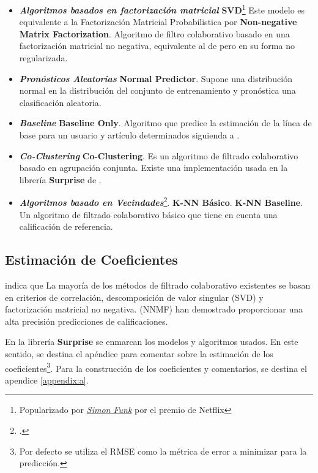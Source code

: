 \documentclass{article}
\begin{document}
\begin{itemize}
    \item \textit{\textbf{Algoritmos basados en factorización matricial}}
    \subitem \textbf{SVD}\footnote{Popularizado por \href{https://sifter.org/~simon/journal/20061211.html}{\textit{Simon Funk}} por el premio de Netflix} Este modelo es equivalente a la Factorización Matricial Probabilistica por \cite{pmf2007}
    \subitem \textbf{Non-negative Matrix Factorization}. Algoritmo de filtro colaborativo basado en una factorización matricial no negativa, equivalente al de \cite{Zhang2013} pero en su forma no regularizada.
    \item \textit{\textbf{Pronósticos Aleatorias}}
    \subitem \textbf{Normal Predictor}. Supone una distribución normal en la distribución del conjunto de entrenamiento y pronóstica una clasificación aleatoria.
    \item \textit{\textbf{Baseline}}
    \subitem \textbf{Baseline Only}. Algoritmo que predice la estimación de la línea de base para un usuario y artículo determinados siguienda a \cite{5197422}.
    \item \textit{\textbf{Co-Clustering}}
    \subitem \textbf{Co-Clustering}. Es un algoritmo de filtrado colaborativo basado en agrupación conjunta. Existe una implementación usada en la librería \textbf{Surprise} de \cite{George05ascalable}.
    \item \textit{\textbf{Algoritmos basado en Vecindades}}\footcite[En la librería Surprise se construyó estos con algoritmos que se derivan directamente de un enfoque básico de vecinos más cercanos.]{Hug2020}.
    \subitem \textbf{K-NN Básico}.
    \subitem \textbf{K-NN Baseline}. Un algoritmo de filtrado colaborativo básico que tiene en cuenta una calificación de referencia.
\end{itemize}

\subsection{Estimación de Coeficientes}

\cite{George2005} indica que La mayoría de los métodos de filtrado colaborativo existentes se basan en criterios de correlación, descomposición de valor singular (SVD) y factorización matricial no negativa. (NNMF) han demostrado proporcionar una alta precisión predicciones de calificaciones.

En la librería \textbf{Surprise} se enmarcan los modelos y algoritmos usados. En este sentido, se destina el apéndice para comentar sobre la estimación de los coeficientes\footnote{Por defecto se utiliza el RMSE como la métrica de error a minimizar para la predicción.}.
Para la construcción de los coeficientes y comentarios, se destina el apendice \ref{appendix:a}.
\end{document}
